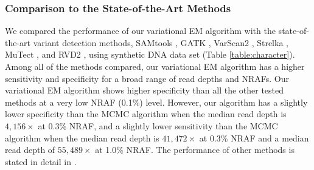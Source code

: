 \documentclass{bmcart}
\begin{document}
\subsubsection{Comparison to the State-of-the-Art Methods}
We compared the performance of our variational EM algorithm with the state-of-the-art variant detection methods, SAMtools \cite{li2009sequence}, GATK \cite{mckenna2010genome}, VarScan2 \cite{koboldt2012varscan}, Strelka \cite{saunders2012strelka}, MuTect \cite{cibulskis2013sensitive}, and RVD2 \cite{he2015rvd2}, using synthetic DNA data set (Table \ref{table:character}).
Among all of the methods compared, our variational EM algorithm has a higher sensitivity and specificity for a broad range of read depths and NRAFs.
Our variational EM algorithm shows higher specificity than all the other tested methods at a very low NRAF (0.1\%) level.
However, our algorithm has a slightly lower specificity than the MCMC algorithm when the median read depth is $4,156\times$ at 0.3\% NRAF, and a slightly lower sensitivity than the MCMC algorithm when the median read depth is $41,472\times$ at 0.3\% NRAF and a median read depth of $55,489\times$ at 1.0\% NRAF.
The performance of other methods is stated in detail in \cite{he2015rvd2}.
\end{document}
